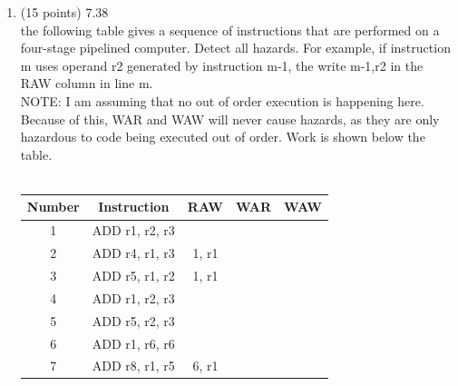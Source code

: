 \documentclass[letterpaper,10pt,onecolumn,titlepage]{article}
\begin{document}
\begin{enumerate}
\item (15 points) 7.38 \\
	the following table gives a sequence of instructions that are performed on a
	four-stage pipelined computer. Detect all hazards. For example, if instruction m
	uses operand r2 generated by instruction m-1, the write m-1,r2 in the RAW column
	in line m. \\
	NOTE: I am assuming that no out of order execution is happening here. Because of
	this, WAR and WAW will never cause hazards, as they are only hazardous to code
	being executed out of order. Work is shown below the table.\\
	\\
	\begin{tabular}{ c c c c c }
		Number & Instruction & RAW & WAR & WAW \\
		\hline
		1 & ADD r1, r2, r3 &        &        &        \\
		2 & ADD r4, r1, r3 & 1, r1  &        &        \\
		3 & ADD r5, r1, r2 & 1, r1  &        &        \\
		4 & ADD r1, r2, r3 &        &        &        \\
		5 & ADD r5, r2, r3 &        &        &        \\
		6 & ADD r1, r6, r6 &        &        &        \\
		7 & ADD r8, r1, r5 & 6, r1  &        &        \\
	\end{tabular}\\
	\\

\end{enumerate}
\end{document}
